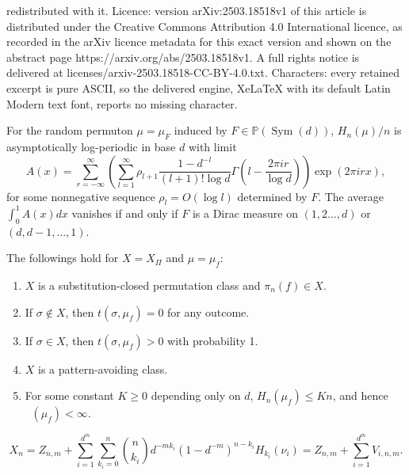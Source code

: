 \documentclass[10pt,a4paper]{amsart}
\newcommand{\PP}{\mathbb{P}}
\newcommand{\Sym}{\mathop{\mathrm{Sym}}}
\newcommand{\upperlinent}{\mathop{\overline{H}^{\mathrm{lin}}}}
\begin{document}
redistributed with it. Licence: version arXiv:2503.18518v1 of this article is distributed under the Creative Commons Attribution 4.0 International licence, as recorded in the arXiv licence metadata for this exact version and shown on the abstract page https://arxiv.org/abs/2503.18518v1. A full rights notice is delivered at licenses/arxiv-2503.18518-CC-BY-4.0.txt. Characters: every retained excerpt is pure ASCII, so the delivered engine, XeLaTeX with its default Latin Modern text font, reports no missing character.
\begin{theorem}\label{thm:random_automorphism}
    For the random permuton $\mu=\mu_F$ induced by $F\in \PP(\Sym(d))$, $H_n(\mu)/n$ is asymptotically log-periodic in base $d$ with limit
    \begin{equation} \label{eq:aut_thm_statement}
    A(x)=\sum_{r=-\infty}^{\infty}\left(\sum_{l=1}^{\infty}\rho_{l+1}\frac{1-d^{-l}}{(l+1)! \log d}\Gamma\left(l-\frac{2\pi i r}{\log d}\right)\right)\exp (2\pi i r x),
    \end{equation}
    for some nonnegative sequence $\rho_l=O(\log l)$ determined by $F$. The average $\int_{0}^{1}A(x)dx$ vanishes if and only if
    $F$ is a Dirac measure on $(1,2\dots ,d)$ or $(d,d-1,\dots ,1)$. 
\end{theorem}

\begin{lemma} \label{lemma:automorphism_finite_lin_entropy}
The followings hold for $X=X_\Pi$ and $\mu=\mu_f$:
\begin{enumerate}
    \item $X$ is a substitution-closed permutation class and $\pi_n(f)\in X$.
    \item If $\sigma\notin X$, then $t(\sigma, \mu_f)=0$ for any outcome.
    \item If $\sigma \in X$, then $t(\sigma, \mu_f)>0$ with probability 1.
    \item $X$ is a pattern-avoiding class.
    \item For some constant $K\geq 0$ depending only on $d$, $H_n(\mu_f)\leq Kn$, and hence $\upperlinent(\mu_f)<\infty$.
\end{enumerate}
\end{lemma}

    \begin{equation}\label{eq:entropy_decomp}
    X_n = Z_{n, m} + \sum_{i=1}^{d^m} \sum_{k_i=0}^{n}\binom{n}{k_i} d^{-mk_i}(1-d^{-m})^{n-k_i}H_{k_i}(\nu_i)=Z_{n, m} + \sum_{i=1}^{d^m}V_{i, n, m}.
    \end{equation}
\end{document}
